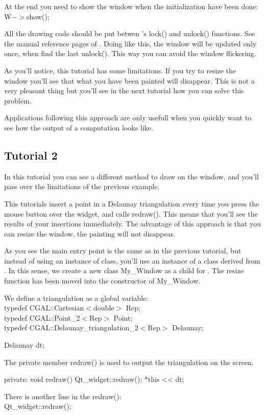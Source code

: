At the end you need to show the window when the initialization have been done:\\
W$->$show();

All the drawing code should be put betwen 's lock() and
unlock() functions. See the manual reference pages of
. Doing like this, the window will be updated only
once, when  find the last unlock(). This way you can avoid the window flickering.

As you'll notice, this tutorial has some limitations. If you try to
resize the window you'll see that what you have been painted will
disappear. This is not a very pleasant thing but you'll see in the
next tutorial how you can solve this problem.

Applications following this approach are only usefull when you quickly
want to see how the output of a computation looks like.

\subsection*{Tutorial 2}

In this tutorial you can see a different method to draw on the window,
and you'll pass over the limitations of the previous example.

This tutorials insert a point in a Delaunay triangulation every time
you press the mouse button over the widget, and calls redraw(). This
means that you'll see the results of your insertions immediately. The
advantage of this approach is that you can resize the window, the
painting will not disappear.

As you see the main entry point is the same as in the previous
tutorial, but instead of using an instance of 
class, you'll use an instance of a class derived from .
In this sense, we create a new class My\_Window as a child for
. The resize function has been moved into the
constructor of My\_Window.

We define a triangulation as a global variable:\\
typedef CGAL::Cartesian$<$double$>$		 Rep;\\
typedef CGAL::Point\_2$<$Rep$>$		    	 Point;\\
typedef CGAL::Delaunay\_triangulation\_2$<$Rep$>$ Delaunay;

Delaunay dt;

The private member redraw() is used to output the triangulation on the screen. 
\begin{ccExampleCode}
private:
  void redraw()
  {
    Qt\_widget::redraw();
    *this << dt;
  }
\end{ccExampleCode}
There is another line in the redraw():\\
Qt\_widget::redraw();

